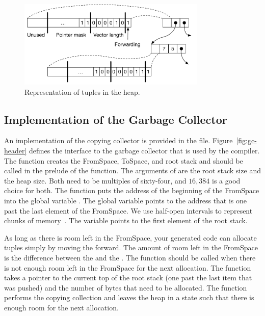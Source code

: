 \documentclass[7x10]{TimesAPriori_MIT}%
\numberwithin{theorem}{chapter}
\numberwithin{definition}{chapter}
\numberwithin{equation}{chapter}
\begin{document}
\begin{figure}[tbp]
  \centering
  \begin{tcolorbox}[colback=white]
    \includegraphics[width=0.8\textwidth]{figs/tuple-rep}
  \end{tcolorbox}
  \caption{Representation of tuples in the heap.}
\label{fig:tuple-rep}
\end{figure}

\subsection{Implementation of the Garbage Collector}
\label{sec:organize-gz}

An implementation of the copying collector is provided in the
 file. Figure~\ref{fig:gc-header} defines the
interface to the garbage collector that is used by the compiler. The
 function creates the FromSpace, ToSpace, and root
stack and should be called in the prelude of the 
function. The arguments of  are the root stack size
and the heap size. Both need to be multiples of sixty-four, and $16,384$ is a
good choice for both.  The  function puts the address
of the beginning of the FromSpace into the global variable
. The global variable  points to
the address that is one past the last element of the FromSpace. We use
half-open intervals to represent chunks of
memory~\citep{Dijkstra:1982aa}.  The  variable
points to the first element of the root stack.

As long as there is room left in the FromSpace, your generated code
can allocate tuples simply by moving the
 forward.
%
The amount of room left in the FromSpace is the difference between the
 and the .  The 
function should be called when there is not enough room left in the
FromSpace for the next allocation.  The  function takes
a pointer to the current top of the root stack (one past the last item
that was pushed) and the number of bytes that need to be
allocated. The  function performs the copying collection
and leaves the heap in a state such that there is enough room for the
next allocation.
\end{document}
